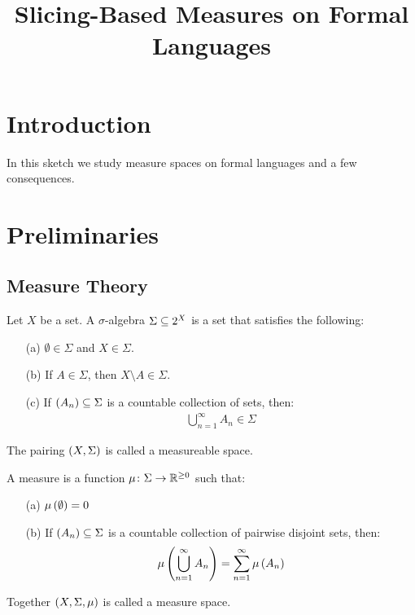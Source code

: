 \documentclass[12pt]{article}
\title{Slicing-Based Measures on Formal Languages}
\date{}
\begin{document}
\maketitle

\section{Introduction}
In this sketch we study
measure spaces on formal languages and a few consequences.

\section{Preliminaries}

\subsection{Measure Theory}
Let \(X\) be a set.
A \(\sigma\)-algebra \(\Sigma \subseteq 2^{X}\) is a set that
satisfies the following:
\begin{enumerate}
  \item[(a)]
    \(\emptyset \in \Sigma\) and \(X \in \Sigma\).

  \item[(b)]
    If \(A \in \Sigma\), then \(X \setminus A \in \Sigma\).

  \item[(c)]
    If \(\left(A_n\right) \subseteq \Sigma\) is a countable collection of sets,
    then:
    \begin{align*}
      \bigcup_{n = 1}^{\infty} A_n \in \Sigma
    \end{align*}

\end{enumerate}
The pairing \(\left(X, \Sigma\right)\) is called a measureable space.

A measure is a function \(\mu \colon \Sigma \to \mathbb{R}^{\geq 0}\) such that:
\begin{enumerate}
  \item[(a)]
    \(\mu\left(\emptyset\right) = 0\)

  \item[(b)]
    If \(\left(A_n\right) \subseteq \Sigma\) is a countable collection
    of pairwise disjoint sets, then:
    \begin{align*}
      \mu\left(\bigcup_{n = 1}^{\infty} A_n\right)
        = \sum_{n = 1}^{\infty} \mu\left(A_n\right)
    \end{align*}
\end{enumerate}
Together \(\left(X, \Sigma, \mu\right)\) is called a measure space.
\end{document}
